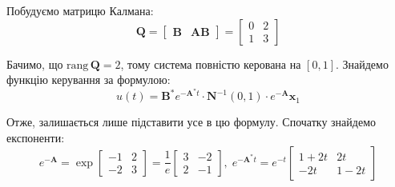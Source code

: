 \documentclass[oneside,solution]{karazin-control-assign}
\begin{document}
Побудуємо матрицю Калмана:
\begin{equation}
    \mathbf{Q} = \begin{bmatrix}
        \mathbf{B} & \mathbf{AB}
    \end{bmatrix} = \begin{bmatrix}
        0 & 2 \\ 1 & 3
    \end{bmatrix}
\end{equation}

Бачимо, що $\text{rang}\,\mathbf{Q} = 2$, тому система повністю керована на $[0,1]$. Знайдемо функцію керування за формулою:
\begin{equation}
    u(t) = \mathbf{B}^*e^{-\mathbf{A}^*t}\cdot\mathbf{N}^{-1}(0,1)\cdot e^{-\mathbf{A}}\mathbf{x}_1
\end{equation}

Отже, залишається лише підставити усе в цю формулу. Спочатку знайдемо експоненти:
\begin{equation}
    e^{-\mathbf{A}} = \exp \begin{bmatrix}
        -1 & 2 \\ -2 & 3
    \end{bmatrix} = \frac{1}{e}\begin{bmatrix}
        3 & -2 \\ 2 & -1
    \end{bmatrix}, \; e^{-\mathbf{A}^*t} = e^{-t}\begin{bmatrix}
        1+2t & 2t \\ -2t & 1-2t
    \end{bmatrix}
\end{equation}
\end{document}
